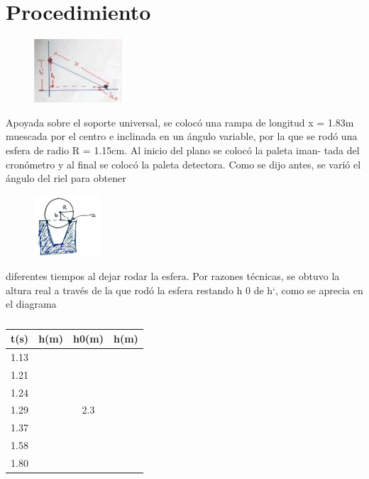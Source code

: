\section{Procedimiento}
\begin{minipage}{0.2\linewidth}
    \begin{figure}[H]
        \includegraphics[scale=0.8]{Images/ima2.png}
        \caption{}
        \label{fig:ima2}
    \end{figure}
\end{minipage}
\begin{minipage}{0.6\linewidth}
    Apoyada sobre el soporte universal, se colocó una rampa de
longitud x = 1.83m muescada por el centro e inclinada en
un ángulo variable, por la que se rodó una esfera de radio
R = 1.15cm. Al inicio del plano se colocó la paleta iman-
tada del cronómetro y al final se colocó la paleta detectora.
Como se dijo antes, se varió el ángulo del riel para obtener
\end{minipage}
\begin{minipage}{0.2\linewidth}
    \begin{figure}[H]
        \includegraphics[scale=1]{Images/ima3.png}
        \caption{}
        \label{fig:ima3}
    \end{figure}
\end{minipage}
diferentes tiempos al dejar rodar la esfera. Por razones técnicas, se obtuvo la altura real a través de la que
rodó la esfera restando h 0 de h‘, como se aprecia en el diagrama\\
\begin{minipage}{0.4\linewidth}
    \begin{table}[H]
        \begin{tabular}{|c|c|c|c|} \hline
            t(s) & h(m)& h0(m)& h(m) \\ \hline
1.13& & &\\ \hline
1.21& & &\\ \hline
1.24& & &\\ \hline
1.29& &2.3 &\\ \hline
1.37& & &\\ \hline
1.58& & &\\ \hline
1.80& & &\\ \hline
        \end{tabular}
        \caption{}
    \end{table}
\end{minipage}